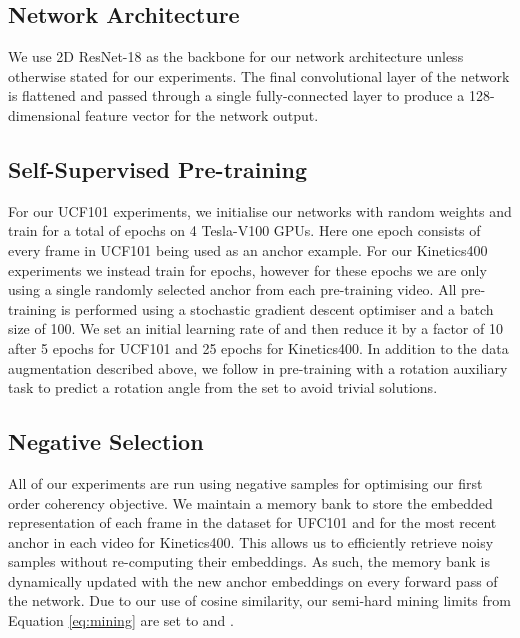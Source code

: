 \documentclass[a4paper,conference]{IEEEtran}
\begin{document}
\subsection{Network Architecture}
We use 2D ResNet-18 \cite{he2016deep} as the backbone for our network architecture unless otherwise stated for our experiments.  The final convolutional layer of the network is flattened and passed through a single fully-connected layer to produce a 128-dimensional feature vector for the network output.

\subsection{Self-Supervised Pre-training}
For our UCF101 experiments, we initialise our networks with random weights and train for a total of  epochs on 4 Tesla-V100 GPUs. Here one epoch consists of every frame in UCF101 being used as an anchor example. For our Kinetics400 experiments we instead train for  epochs, however for these epochs we are only using a single randomly selected anchor from each pre-training video. All pre-training is performed using a stochastic gradient descent optimiser and a batch size of 100. We set an initial learning rate of  and then reduce it by a factor of 10 after 5 epochs for UCF101 and 25 epochs for Kinetics400. In addition to the data augmentation described above, we follow \cite{gidaris2018unsupervised} in pre-training with a rotation auxiliary task to predict a rotation angle from the set  to avoid trivial solutions.

\subsection{Negative Selection}
All of our experiments are run using  negative samples for optimising our first order coherency objective. We maintain a memory bank to store the embedded representation of each frame in the dataset for UFC101 and for the most recent anchor in each video for Kinetics400. This allows us to efficiently retrieve noisy samples without re-computing their embeddings. As such, the memory bank is dynamically updated with the new anchor embeddings on every forward pass of the network. Due to our use of cosine similarity, our semi-hard mining limits from Equation \ref{eq:mining} are set to  and .
\end{document}
